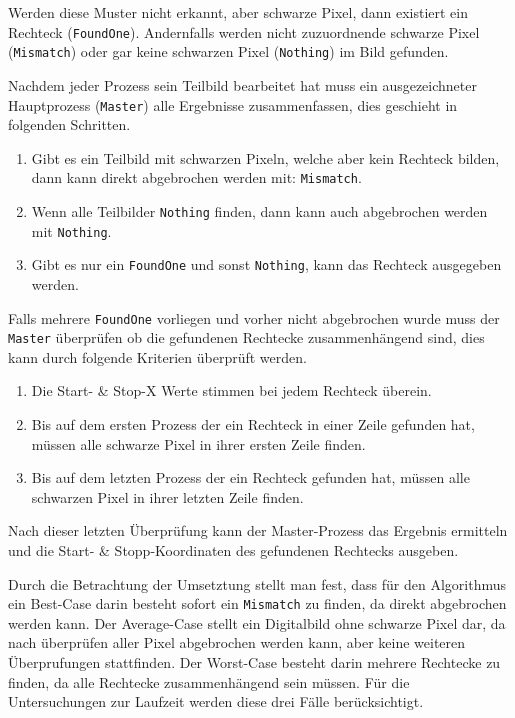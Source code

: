 Werden diese Muster nicht erkannt, aber schwarze Pixel, dann existiert ein Rechteck (\texttt{FoundOne}). Andernfalls werden nicht zuzuordnende schwarze Pixel (\texttt{Mismatch}) oder gar keine schwarzen Pixel (\texttt{Nothing}) im Bild gefunden.

Nachdem jeder Prozess sein Teilbild bearbeitet hat muss ein ausgezeichneter Hauptprozess (\texttt{Master}) alle Ergebnisse zusammenfassen, dies geschieht in folgenden Schritten.

\begin{enumerate}
	\item Gibt es ein Teilbild mit schwarzen Pixeln, welche aber kein Rechteck bilden, dann kann direkt abgebrochen werden mit: \texttt{Mismatch}.
	\item Wenn alle Teilbilder \texttt{Nothing} finden, dann kann auch abgebrochen werden mit \texttt{Nothing}.
	\item Gibt es nur ein \texttt{FoundOne} und sonst \texttt{Nothing}, kann das Rechteck ausgegeben werden.
\end{enumerate}

Falls mehrere \texttt{FoundOne} vorliegen und vorher nicht abgebrochen wurde muss der \texttt{Master} überprüfen ob die gefundenen Rechtecke zusammenhängend sind, dies kann durch folgende Kriterien überprüft werden.

\begin{enumerate}
	\item Die Start- \& Stop-X Werte stimmen bei jedem Rechteck überein.
	\item Bis auf dem ersten Prozess der ein Rechteck in einer Zeile gefunden hat, müssen alle schwarze Pixel in ihrer ersten Zeile finden.
	\item Bis auf dem letzten Prozess der ein Rechteck gefunden hat, müssen alle schwarzen Pixel in ihrer letzten Zeile finden.
\end{enumerate}

Nach dieser letzten Überprüfung kann der Master-Prozess das Ergebnis ermitteln und die Start- \& Stopp-Koordinaten des gefundenen Rechtecks ausgeben. 

Durch die Betrachtung der Umsetztung stellt man fest, dass für den Algorithmus ein Best-Case darin besteht sofort ein \texttt{Mismatch} zu finden, da direkt abgebrochen werden kann. Der Average-Case stellt ein Digitalbild ohne schwarze Pixel dar, da nach überprüfen aller Pixel abgebrochen werden kann, aber keine weiteren Überprufungen stattfinden. Der Worst-Case besteht darin mehrere Rechtecke zu finden, da alle Rechtecke zusammenhängend sein müssen. Für die Untersuchungen zur Laufzeit werden diese drei Fälle berücksichtigt.


